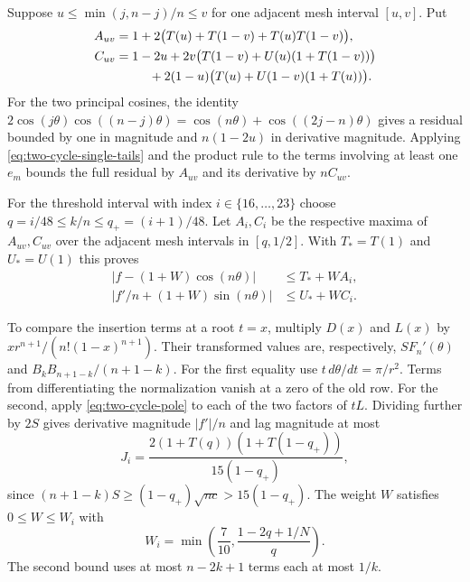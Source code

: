 Suppose $u\le\min(j,n-j)/n\le v$ for one adjacent mesh interval
$[u,v]$. Put
\begin{align*}
 A_{uv}&=1+2\bigl(T(u)+T(1-v)+T(u)T(1-v)\bigr),\\
 C_{uv}&=1-2u+
 2v\bigl(T(1-v)+U(u)(1+T(1-v))\bigr)\\
 &\hspace{2.65em}
 +2(1-u)\bigl(T(u)+U(1-v)(1+T(u))\bigr).
\end{align*}
For the two principal cosines, the identity
$2\cos(j\theta)\cos((n-j)\theta)=\cos(n\theta)+\cos((2j-n)\theta)$
gives a residual bounded by one in magnitude and $n(1-2u)$ in
derivative magnitude. Applying \eqref{eq:two-cycle-single-tails} and
the product rule to the terms involving at least one $e_m$ bounds
the full residual by $A_{uv}$ and its derivative by $nC_{uv}$.

For the threshold interval with index $i\in\{16,\ldots,23\}$ choose
$q=i/48\le k/n\le q_+=(i+1)/48$. Let $A_i,C_i$ be the respective
maxima of $A_{uv},C_{uv}$ over the adjacent mesh intervals in
$[q,1/2]$. With $T_*=T(1)$ and $U_*=U(1)$ this proves
\begin{equation}
 \begin{split}
 |f-(1+W)\cos(n\theta)|&\le T_*+WA_i,\\
 |f'/n+(1+W)\sin(n\theta)|&\le U_*+WC_i.
 \end{split}
 \label{eq:two-cycle-mixed-tails}
\end{equation}

To compare the insertion terms at a root $t=x$, multiply $D(x)$
and $L(x)$ by $x r^{n+1}/(n!(1-x)^{n+1})$.
Their transformed values are, respectively,
$S F_n'(\theta)$ and $B_kB_{n+1-k}/(n+1-k)$.
For the first equality use $t\,d\theta/dt=\pi/r^2$.
Terms from differentiating the normalization vanish at a zero of the
old row. For the second, apply
\eqref{eq:two-cycle-pole} to each of the two factors of $tL$.
Dividing further by $2S$ gives derivative magnitude $|f'|/n$
and lag magnitude at most
\[
 J_i=\frac{2(1+T(q))(1+T(1-q_+))}{15(1-q_+)},
\]
since $(n+1-k)S\ge(1-q_+)\sqrt{nc}>15(1-q_+)$.
The weight $W$ satisfies $0\le W\le W_i$ with
\[
 W_i=\min\left(\frac7{10},\frac{1-2q+1/N}{q}\right).
\]
The second bound uses at most $n-2k+1$ terms each at most $1/k$.

